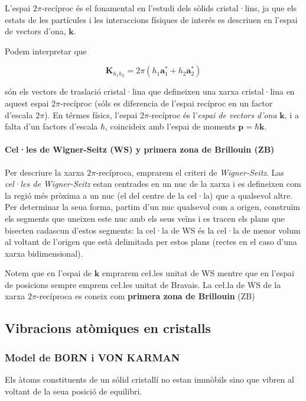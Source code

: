 \documentclass[12pt]{article} %
\let\vec\mathbf %
\begin{document}
L'espai $2\pi$-recíproc és el fonamental en l'estudi dels sòlids cristal·lins, ja que els estats de les partícules i les interaccions físiques de interés es descriuen en l'espai de vectors d'ona, $\vec k$.



Podem interpretar que 

\begin{equation}
\label{eq:rec3}
\vec K_{h_1h_2}=2\pi\left(h_1\vec a_1^{*}+h_2\vec a_2^{*}\right)
\end{equation}

són els vectors de traslació cristal·lina que defineixen una xarxa cristal·lina en aquest espai $2\pi$-recíproc (sóls es diferencia de l'espai recíproc en un factor d'escala $2\pi$). En térmes físics, l'espai $2\pi$-recíproc és l'\emph{espai de vectors d'ona} $\vec k$, i a falta d'un factors d'escala $\hbar$, coincideix amb l'espai de moments  $\vec p=\hbar\vec k$. 

\paragraph{Cel·les de Wigner-Seitz (WS) y primera zona de Brillouin (ZB)}

Per descriure la xarxa $2\pi$-recíproca, emprarem el criteri de \textit{Wigner-Seitz}. Las \textit{cel·les de Wigner-Seitz} estan centrades en un nuc de la xarxa i es defineixen com la regió més pròxima a un nuc (el del centre de la cel·la) que a qualsevol altre. Per determinar la seua forma, partim d'un nuc qualsevol com a origen, construïm els segments que uneixen este nuc amb els seus veïns i es tracen els plans que bisecten cadascun d'estos segments: la cel·la de WS és la cel·la de menor volum al voltant de l'origen que està delimitada per estos plans (rectes en el caso d'una xarxa bidimensional).

Notem que en l'espai de $\vec k$ emprarem ce\l.les unitat de WS mentre que en l'espai de posicions sempre emprem ce\l.les unitat de Bravais.
La ce\l.la de WS de la xarxa $2\pi$-recíproca es coneix com \textbf{primera zona de Brillouin} (ZB)


\subsection{Vibracions atòmiques en cristalls}
\subsubsection{Model de BORN i VON KARMAN}
Els àtoms constituents de un sólid cristallí no estan immòbils sino que vibren al voltant de la seua posició de equilibri.
\end{document}
